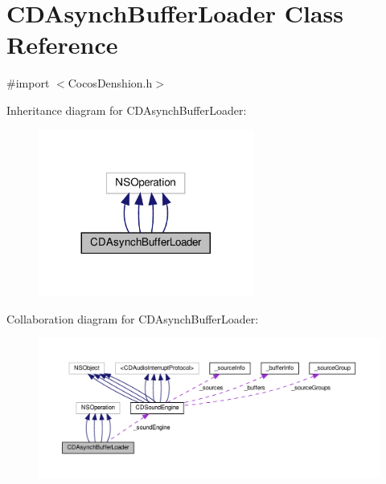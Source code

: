 \hypertarget{interfaceCDAsynchBufferLoader}{}\section{C\+D\+Asynch\+Buffer\+Loader Class Reference}
\label{interfaceCDAsynchBufferLoader}


{\ttfamily \#import $<$Cocos\+Denshion.\+h$>$}



Inheritance diagram for C\+D\+Asynch\+Buffer\+Loader\+:
\nopagebreak
\begin{figure}[H]
\begin{center}
\leavevmode
\includegraphics[width=200pt]{interfaceCDAsynchBufferLoader__inherit__graph}
\end{center}
\end{figure}


Collaboration diagram for C\+D\+Asynch\+Buffer\+Loader\+:
\nopagebreak
\begin{figure}[H]
\begin{center}
\leavevmode
\includegraphics[width=350pt]{interfaceCDAsynchBufferLoader__coll__graph}
\end{center}
\end{figure}
